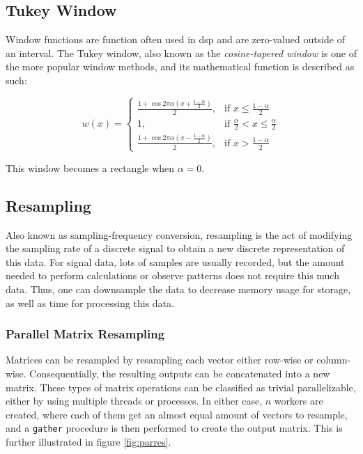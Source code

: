 \subsection{Tukey Window}
\label{dsp:tukey}

Window functions are function often used in \acrshort{dsp} and are zero-valued outside of an interval. The Tukey window, also known as the \textit{cosine-tapered window} is one of the more popular window methods, and its mathematical function is described as such: 

\[
    w(x)= 
\begin{cases}
    \frac{1 + \cos{2 \pi \alpha (x + \frac{1-\alpha}{2})}}{2}, & \text{if } x \leq \frac{1-\alpha}{2}\\
    1,              & \text{if } \frac{\alpha}{2} < x \leq \frac{\alpha}{2}\\
    \frac{1 + \cos{2 \pi \alpha (x - \frac{1-\alpha}{2})}}{2}, & \text{if } x > \frac{1-\alpha}{2}
\end{cases}
\]

This window becomes a rectangle when $\alpha = 0$.


\subsection{Resampling}

Also known as sampling-frequency conversion, resampling is the act of modifying the sampling rate of a discrete signal to obtain a new discrete representation of this data. For signal data, lots of samples are usually recorded, but the amount needed to perform calculations or observe patterns does not require this much data. Thus, one can downsample the data to decrease memory usage for storage, as well as time for processing this data. \\

\subsubsection{Parallel Matrix Resampling}

Matrices can be resampled by resampling each vector either row-wise or column-wise. Consequentially, the resulting outputs can be concatenated into a new matrix. These types of matrix operations can be classified as trivial parallelizable, either by using multiple threads or processes. In either case, $n$ workers are created, where each of them get an almost equal amount of vectors to resample, and a \texttt{gather} procedure is then performed to create the output matrix. This is further illustrated in figure \ref{fig:parres}.

